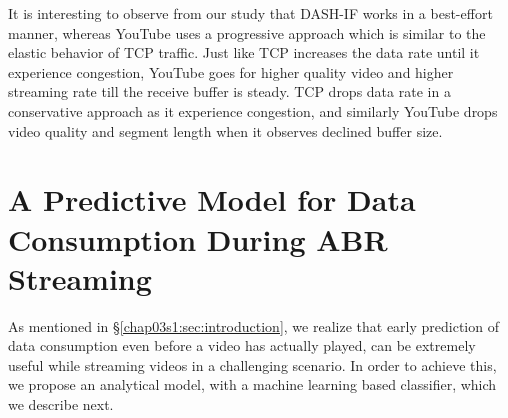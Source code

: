 It is interesting to observe from our study that \ac{DASH-IF} works in a best-effort manner, whereas YouTube uses a progressive approach which is similar to the elastic behavior of \ac{TCP} traffic. Just like \ac{TCP} increases the data rate until it experience congestion, YouTube goes for higher quality video and higher streaming rate till the receive buffer is steady. \ac{TCP} drops data rate in a conservative approach as it experience congestion, and similarly YouTube drops video quality and segment length when it observes declined buffer size.


\section{A Predictive Model for Data Consumption During ABR Streaming}
\label{chap03s1:sec:model}

As mentioned in \S\ref{chap03s1:sec:introduction}, we realize that early prediction of data consumption even before a video has actually played, can be extremely useful while streaming videos in a challenging scenario.
In order to achieve this, we propose an analytical model, with a machine learning based classifier, which we describe next.

